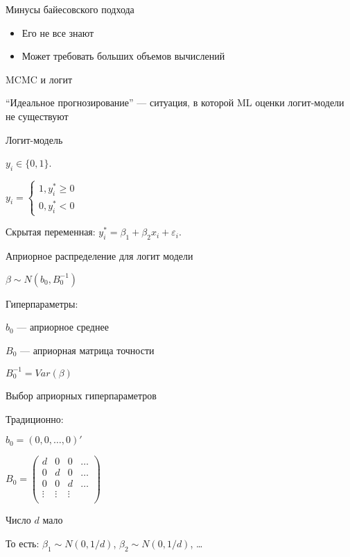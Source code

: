 \documentclass[ignorenonframetext,]{beamer}
\begin{document}
\begin{frame}{Минусы байесовского подхода}

\begin{itemize}
\item
  Его не все знают
\item
  Может требовать больших объемов вычислений
\end{itemize}

\end{frame}

\begin{frame}{MCMC и логит}

``Идеальное прогнозирование'' --- ситуация, в которой ML оценки
логит-модели не существуют

\end{frame}

\begin{frame}{Логит-модель}

\(y_i \in \{0,1\}\).

\(y_i=\begin{cases} 1, y^*_i \geq 0 \\ 0, y^*_i <0 \end{cases}\)

Скрытая переменная: \(y^*_i=\beta_1 +\beta_2 x_i +\varepsilon_i\).

\end{frame}

\begin{frame}{Априорное распределение для логит модели}

\(\beta \sim N(b_0, B_0^{-1})\)

Гиперпараметры:

\(b_0\) --- априорное среднее

\(B_0\) --- априорная матрица точности

\(B_0^{-1}=Var(\beta)\)

\end{frame}

\begin{frame}{Выбор априорных гиперпараметров}

Традиционно:

\(b_0 = (0, 0, \ldots, 0)'\)

\(B_0 = \begin{pmatrix} d & 0 & 0 & \ldots \\ 0 & d & 0 & \ldots \\ 0 & 0 & d & \ldots \\ \vdots & \vdots & \vdots & \\ \end{pmatrix}\)

Число \(d\) мало

То есть: \(\beta_1 \sim N(0, 1/d)\), \(\beta_2 \sim N(0, 1/d)\),
\ldots{}

\end{frame}
\end{document}

